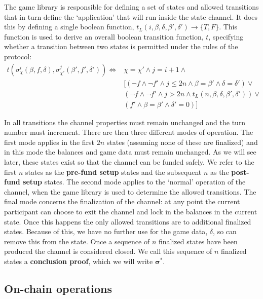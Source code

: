 \documentclass{article}
\theoremstyle{definition}
\begin{document}
The game library is responsible for defining a set of states and allowed transitions that
in turn define the `application' that will run inside the state channel. It does this by
defining a single boolean function, $t_L(i, \beta, \delta, \beta', \delta') \rightarrow \{ T, F\}$.
This function is used to derive an overall boolean transition function, $t$, specifying whether
a transition between two states is permitted under the rules of the protocol:
\begin{align*}
  t(\sigma_\chi^i(\beta, f, \delta), \sigma_{\chi'}^j(\beta', f', \delta') ) \Leftrightarrow &
    \chi = \chi'
    \wedge j = i + 1
    \wedge \\
    & [ (\neg f \wedge \neg f' \wedge j \leq 2n \wedge \beta = \beta' \wedge \delta = \delta') \vee \\
    & (\neg f \wedge \neg f' \wedge j > 2n \wedge t_L(n, \beta, \delta, \beta', \delta')) \vee \\
    & (f' \wedge \beta = \beta' \wedge \delta' = 0) ]
\end{align*}

In all transitions the channel properties must remain unchanged and the turn number must increment.
There are then three different modes of operation. The first mode applies in the first $2n$
states (assuming none of these are finalized) and in this mode the balances and game data
must remain unchanged. As we will see later, these states exist so that the channel can be
funded safely. We refer to the first $n$ states as the \textbf{pre-fund setup} states and
the subsequent $n$ as the \textbf{post-fund setup} states. The second mode applies to the
`normal' operation of the channel, when the game library is used to determine the allowed
transitions. The final mode concerns the finalization of the channel: at any point the current
participant can choose to exit the channel and lock in the balances in the current state.
Once this happens the only allowed transitions are to additional finalized states. Because
of this, we have no further use for the game data, $\delta$, so can remove this from the state.
Once a sequence of $n$ finalized states have been produced the channel is considered closed. We
call this sequence of $n$ finalized states a \textbf{conclusion proof}, which we will write $\bm{\sigma}^*$.



\subsection{On-chain operations}
\end{document}
